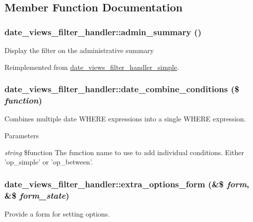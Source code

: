 \subsection{Member Function Documentation}
\hypertarget{classdate__views__filter__handler_a214c46a8a095cad6ac6159cbedbb4f35}{
\subsubsection[{admin\_\-summary}]{\setlength{\rightskip}{0pt plus 5cm}date\_\-views\_\-filter\_\-handler::admin\_\-summary ()}}
\label{classdate__views__filter__handler_a214c46a8a095cad6ac6159cbedbb4f35}
Display the filter on the administrative summary 

Reimplemented from \hyperlink{classdate__views__filter__handler__simple_a0eb855c3f94765f6295868b81a27b9c3}{date\_\-views\_\-filter\_\-handler\_\-simple}.\hypertarget{classdate__views__filter__handler_a130779ebea594cff22728f1088ebbc5e}{
\subsubsection[{date\_\-combine\_\-conditions}]{\setlength{\rightskip}{0pt plus 5cm}date\_\-views\_\-filter\_\-handler::date\_\-combine\_\-conditions (\$ {\em function})}}
\label{classdate__views__filter__handler_a130779ebea594cff22728f1088ebbc5e}
Combines multiple date WHERE expressions into a single WHERE expression.


\begin{DoxyParams}{Parameters}
\item[{\em string}]\$function The function name to use to add individual conditions. Either 'op\_\-simple' or 'op\_\-between'. \end{DoxyParams}
\hypertarget{classdate__views__filter__handler_a17b0b4b30f8c2bcb368bbb6fd9eabcd1}{
\subsubsection[{extra\_\-options\_\-form}]{\setlength{\rightskip}{0pt plus 5cm}date\_\-views\_\-filter\_\-handler::extra\_\-options\_\-form (\&\$ {\em form}, \/  \&\$ {\em form\_\-state})}}
\label{classdate__views__filter__handler_a17b0b4b30f8c2bcb368bbb6fd9eabcd1}
Provide a form for setting options. 

